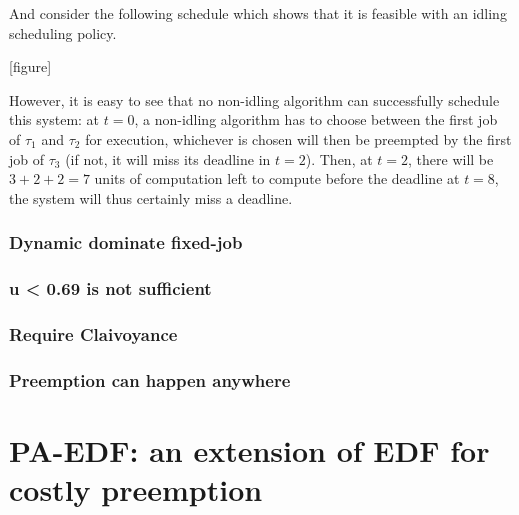 \documentclass[a4paper,10pt]{article}
\begin{document}
        And consider the following schedule which shows that it is feasible with an idling scheduling policy.

        [figure]

        However, it is easy to see that no non-idling algorithm can successfully schedule this system: at $t=0$, a non-idling algorithm has to choose between the first job of $\tau_1$ and $\tau_2$ for execution, whichever is chosen will then be preempted by the first job of $\tau_3$ (if not, it will miss its deadline in $t=2$). Then, at $t=2$, there will be $3+2+2=7$ units of computation left to compute before the deadline at $t=8$, the system will thus certainly miss a deadline.


        \subsubsection{Dynamic dominate fixed-job}

        \subsubsection{u < 0.69 is not sufficient}

        \subsubsection{Require Claivoyance}

        \subsubsection{Preemption can happen anywhere}

\section{PA-EDF: an extension of EDF for costly preemption}

\nocite{*}


\end{document}
